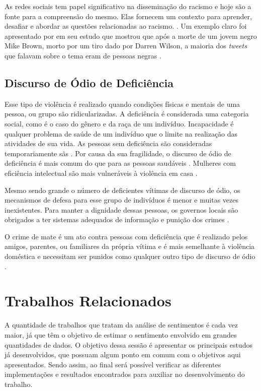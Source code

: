 As redes sociais tem papel significativo na disseminação do racismo e hoje são a fonte para a compreensão do mesmo. Elas fornecem um contexto para aprender, desafiar e abordar as questões relacionadas ao racismo.  \cite{Chetty2018}. Um exemplo claro foi apresentado por  em seu estudo que mostrou que após a morte de um jovem negro Mike Brown, morto por um tiro dado por Darren Wilson, a maioria dos \textit{tweets} que falavam sobre o tema eram de pessoas negras \cite{Chaudhry2016}.

\subsection{Discurso de Ódio de Deficiência}

Esse tipo de violência é realizado quando condições físicas e mentais de uma pessoa, ou grupo são ridicularizadas. A deficiência é considerada uma categoria social, como é o caso do gênero e da raça de um indivíduo. Incapacidade é qualquer problema de saúde de um indivíduo que o limite na realização das atividades de sua vida. As pessoas sem deficiência são consideradas temporariamente sãs \cite{doi:10.1086/ahr/108.3.763}. Por causa da sua fragilidade, o discurso de ódio de deficiência é mais comum do que para as pessoas saudáveis \cite{Chetty2018}. Mulheres com eficiência intelectual são mais vulneráveis à violência em casa \cite{McCarthy2017}. 

Mesmo sendo grande o número de deficientes vítimas de discurso de ódio, os mecanismos de defesa para esse grupo de indivíduos é menor e muitas vezes inexistentes. Para manter a dignidade dessas pessoas, os governos locais são obrigados a ter sistemas adequados de informação e punição dos crimes \cite{Macdonald2017}.

O crime de mate é um ato contra pessoas com deficiência que é realizado pelos amigos, parentes, ou familiares da própria vítima e é mais semelhante à violência doméstica e necessitam ser punidos como qualquer outro tipo de discurso de ódio \cite{Chetty2018}. 

\section{Trabalhos Relacionados}
A quantidade de trabalhos que tratam da análise de sentimentos é cada vez maior, já que têm o objetivo de estimar o sentimento envolvido em grandes quantidades de dados. O objetivo dessa sessão é apresentar os principais estudos já desenvolvidos, que possuam algum ponto em comum com o objetivos aqui apresentados. Sendo assim, ao final será possível verificar as diferentes implementações e resultados encontrados para auxiliar no desenvolvimento do trabalho.

